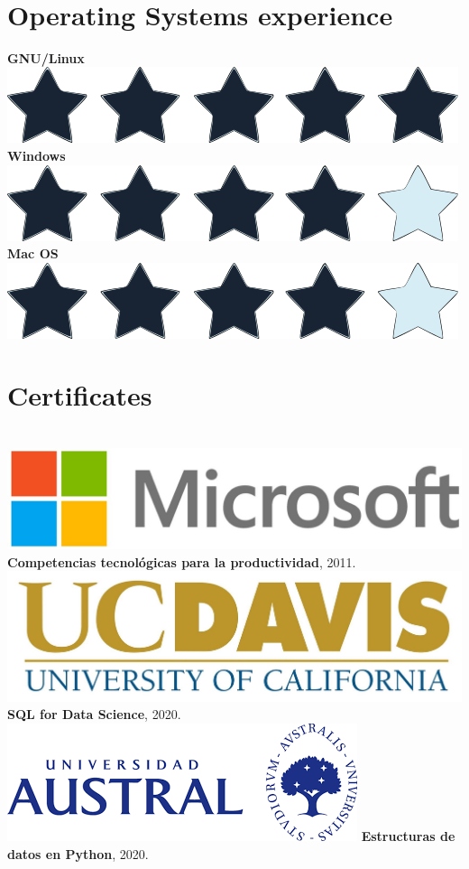 \documentclass[]{friggeri-cv}
\begin{document}
\begin{aside}
~
~
~
	\section{Operating Systems experience}
    \textbf{GNU/Linux}\includegraphics[scale=0.07]{img/5stars.png}
    \textbf{Windows}\includegraphics[scale=0.07]{img/4stars.png}
    \textbf{Mac OS}\includegraphics[scale=0.07]{img/4stars.png}
	\section{Certificates}
	~
     	\includegraphics[scale=0.04]{img/Microsoft.jpg}
	\textbf{Competencias tecnológicas para la productividad}, 2011.
	\includegraphics[scale=0.2]{img/ucdavis.jpg}
	\textbf{SQL for Data Science}, 2020.
	\includegraphics[scale=0.2]{img/Austral.png}
	\textbf{Estructuras de datos en Python}, 2020.

\end{aside}
\end{document}
